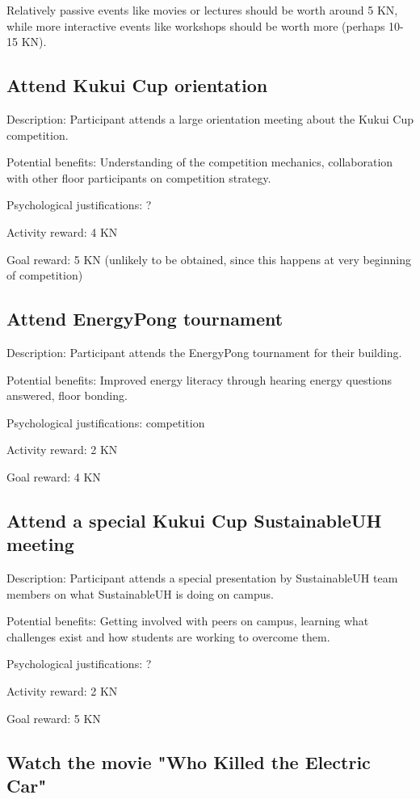Relatively passive events like movies or lectures should be worth around 5 KN, while more interactive events like workshops should be worth more (perhaps 10-15 KN).

\subsection{Attend Kukui Cup orientation}

Description: Participant attends a large orientation meeting about the Kukui Cup competition.

Potential benefits: Understanding of the competition mechanics, collaboration with other floor participants on competition strategy.

Psychological justifications: ?

Activity reward: 4 KN

Goal reward: 5 KN (unlikely to be obtained, since this happens at very beginning of competition)

\subsection{Attend EnergyPong tournament}

Description: Participant attends the EnergyPong tournament for their building.

Potential benefits: Improved energy literacy through hearing energy questions answered, floor bonding.

Psychological justifications: competition

Activity reward: 2 KN

Goal reward: 4 KN

\subsection{Attend a special Kukui Cup SustainableUH meeting}

Description: Participant attends a special presentation by SustainableUH team members on what SustainableUH is doing on campus.

Potential benefits: Getting involved with peers on campus, learning what challenges exist and how students are working to overcome them.

Psychological justifications: ?

Activity reward: 2 KN

Goal reward: 5 KN

\subsection{Watch the movie "Who Killed the Electric Car"}

